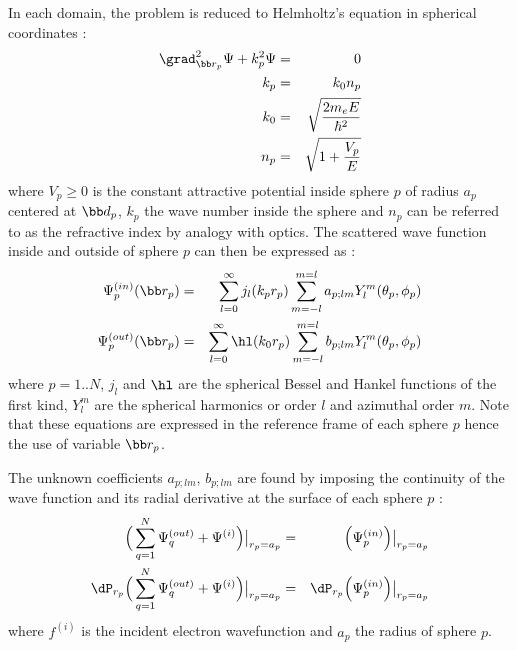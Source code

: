 In each domain, the problem is reduced to Helmholtz's equation
in spherical coordinates  :
%
\begin{eqnarray*}
  \grad_{\bb r_p}^2\Psi + k_p^2 \Psi &=& 0\\
  k_p &=& k_0n_p\\
  k_0 &=& \sqrt{\frac{2m_eE}{\hbar^2}}\\
  n_p &=& \sqrt{1+\frac{V_p}{E}}
\end{eqnarray*}
%
where $V_p\ge 0$ is the constant attractive potential inside sphere $p$ of radius
$a_p$ centered at $\bb d_p$, $k_p$ the wave number inside the sphere and $n_p$
can be referred to as the refractive index by analogy with optics.
The scattered wave function inside and outside of sphere $p$ can then be expressed
as :
%
\begin{eqnarray*}
  \Psi_p^{(in )}(\bb r_p) &=& \sum_{l=0}^{\infty}j_l(k_pr_p)\sum_{m=-l}^{m=l}a_{p;lm}Y_l^m(\theta_p,\phi_p)\\
  \Psi_p^{(out)}(\bb r_p) &=& \sum_{l=0}^{\infty}\hl(k_0r_p)\sum_{m=-l}^{m=l}b_{p;lm}Y_l^m(\theta_p,\phi_p)\\
\end{eqnarray*}
%
where $p=1..N$,
$j_l$ and $\hl$ are the spherical Bessel and Hankel functions of the first
kind, $Y_l^m$ are the spherical harmonics or order $l$ and azimuthal order $m$.
Note that these equations are expressed in the reference frame of each
sphere $p$ hence the use of variable $\bb r_p$.

The unknown coefficients $a_{p;lm}$, $b_{p;lm}$ are found by imposing the
continuity of the wave function and its radial derivative at the surface of each
sphere $p$ :
%
\begin{eqnarray*}
      \Big(\sum_{q=1}^N \Psi_q^{(out)}+\Psi^{(i)}\Big)\big|_{r_p=a_p}
  &=& \Big(\Psi_p^{(in)}\Big)\big|_{r_p=a_p} \\
      \dP_{r_p}\Big(\sum_{q=1}^N \Psi_q^{(out)}+\Psi^{(i)}\Big)\big|_{r_p=a_p}
  &=& \dP_{r_p}\Big(\Psi_p^{(in)}\Big)\big|_{r_p=a_p} \\
\end{eqnarray*}
%
where $f^{(i)}$ is the incident electron wavefunction and $a_p$ the
radius of sphere $p$.


